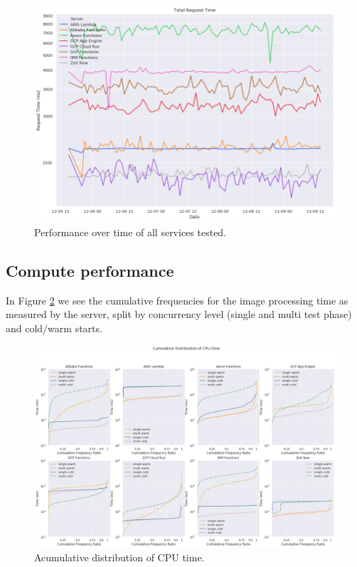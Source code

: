\documentclass[11pt]{article}
\begin{document}
\begin{figure}[h]
\includegraphics[width=14cm]{perfovertime.png}
\centering
\caption{Performance over time of all services tested.}
\label{Fig:performance}
\end{figure}


\subsection{Compute performance}
In Figure \ref{Fig:cputime}
we see the cumulative frequencies for the image processing time
as measured by the server, split by concurrency level (single and multi test phase) and cold/warm starts.


\begin{figure}[h]
\includegraphics[width=14cm]{cputime.png}
\centering
\caption{Acumulative distribution of CPU time.}
\label{Fig:cputime}
\end{figure}
\end{document}
